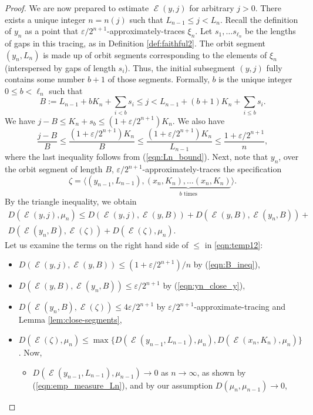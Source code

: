 \documentclass[10pt,a4paper]{amsart}
\DeclareMathOperator{\Emp}{\mathcal{E}}%
\newcommand{\eps}{\varepsilon}
\begin{document}
\begin{proof}
We are now prepared to estimate $\Emp(y, j)$ for arbitrary $j>0$. There exists a unique integer $n = n(j)$ such that $L_{n-1} \le j < L_n$. Recall the definition of $y_n$ as a point that $\eps / 2^{n+1}$-approximately-traces $\xi_n$. Let $s_1, \dots s_{\ell_n}$ be the lengths of gaps in this tracing, as in Definition \ref{def:faithful2}. The orbit segment $(y_n, L_n)$ is made up of orbit segments corresponding to the elements of $\xi_n$ (interspersed by gaps of length $s_i$). Thus, the initial subsegment $(y, j)$ fully contains some number $b+1$ of those segments. Formally, $b$ is the unique integer $0 \le b < \ell_n$ such that
\[
B := L_{n-1} + bK_n + \sum_{i < b} s_i \le j < L_{n-1} + (b+1)K_n + \sum_{i \le b} s_i.
\]
We have $j - B \le K_n + s_b \le (1 + \eps / 2^{n+1}) K_n$. We also have
\begin{equation} \label{eqn:B_ineq}
\frac{j - B}{B} \le \frac{(1 + \eps / 2^{n+1}) K_n}{B} \le
\frac{(1 + \eps / 2^{n+1}) K_n}{L_{n-1}} \le \frac{1 + \eps / 2^{n+1}}{n},
\end{equation}
where the last inequality follows from (\ref{eqn:Ln_bound}). Next, note that $y_n$, over the orbit segment of length $B$, $\eps / 2^{n+1}$-approximately-traces the specification
\[
\zeta = \langle
(y_{n-1}, L_{n-1}), \underbrace{(x_n, K_n), \dots (x_n, K_n)}_{b \textrm{ times}}
\rangle.
\]
By the triangle inequality, we obtain
\begin{multline} \label{eqn:temp12}
D(\Emp(y, j), \mu_{n}) \le
D(\Emp(y, j), \Emp(y, B)) + D(\Emp(y, B), \Emp(y_n, B)) + \\
D(\Emp(y_n, B), \Emp(\zeta)) + D(\Emp(\zeta), \mu_{n}).
\end{multline}
Let us examine the terms on the right hand side of $\le$ in \eqref{eqn:temp12}:
\begin{itemize}
  \item $D(\Emp(y, j), \Emp(y, B)) \le (1 + \eps / 2^{n+1}) / n$ by (\ref{eqn:B_ineq}),
  \item $D(\Emp(y, B), \Emp(y_n, B)) \le \eps / 2^{n+1}$ by (\ref{eqn:yn_close_y}),
  \item $D(\Emp(y_n, B), \Emp(\zeta)) \le 4\eps / 2^{n+1}$ by $\eps / 2^{n+1}$-approximate-tracing and Lemma \ref{lem:close-segments},
  \item $D(\Emp(\zeta), \mu_{n}) \le \max \{ D(\Emp(y_{n-1}, L_{n-1}), \mu_{n}), D(\Emp(x_n, K_n), \mu_{n}) \}$.
  Now,
  \begin{itemize}
    \item[$\circ$] $D(\Emp(y_{n-1}, L_{n-1}), \mu_{n-1}) \to 0$ as $n \to \infty$, as shown by (\ref{eqn:emp_measure_Ln}), and by our assumption $D(\mu_n, \mu_{n-1}) \to 0$,

\end{itemize}
\end{itemize}
\end{proof}
\end{document}
